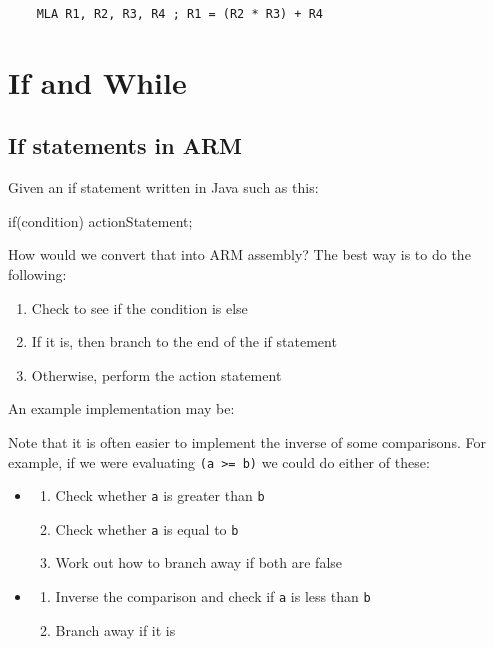 \begin{verbatim}
	MLA	R1, R2, R3, R4 ; R1 = (R2 * R3) + R4
\end{verbatim}

\section{If and While}

\subsection{If statements in ARM}

Given an if statement written in Java such as this:

\begin{listing}{1}
if(condition)
{
    actionStatement;
}
\end{listing}

How would we convert that into ARM assembly? The best way is to do the
following:

\begin{enumerate}

	\item Check to see if the condition is else

	\item If it is, then branch to the end of the if statement

	\item Otherwise, perform the action statement

\end{enumerate}

An example implementation may be:


Note that it is often easier to implement the inverse of some comparisons. For
example, if we were evaluating {\tt (a >= b)} we could do either of these:

\begin{itemize}
	\item 
	\begin{enumerate}
		\item Check whether {\tt a} is greater than {\tt b}
		\item Check whether {\tt a} is equal to {\tt b}
		\item Work out how to branch away if both are false
	\end{enumerate}
	\item 
	\begin{enumerate}
		\item Inverse the comparison and check if {\tt a} is less than {\tt b}
		\item Branch away if it is
	\end{enumerate}
\end{itemize}

